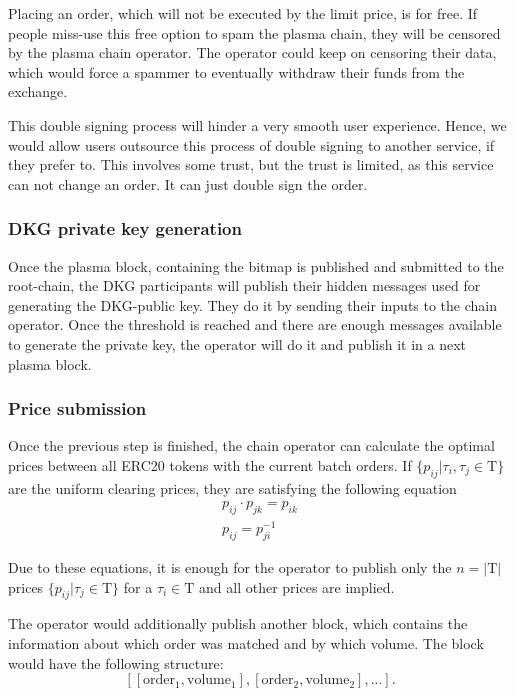 \documentclass[11pt,parskip=full]{scrartcl}%
\newcommand{\Tau}{\mathrm{T}}
\begin{document}
Placing an order, which will not be executed by the limit price, is for free. 
If people miss-use this free option to spam the plasma chain, they will be censored by the plasma chain operator. 
The operator could keep on censoring their data, which would force a spammer to eventually withdraw their funds from the exchange. 

This double signing process will hinder a very smooth user experience. 
Hence, we would allow users outsource this process of double signing to another service, if they prefer to. 
This involves some trust, but the trust is limited, as this service can not change an order. It can just double sign the order. 

\subsubsection{DKG private key generation}
Once the plasma block, containing the bitmap is published and submitted to the root-chain, the DKG participants will publish their hidden messages used for generating the DKG-public key. 
They do it by sending their inputs to the chain operator.
Once the threshold is reached and there are enough messages available to generate the private key, the operator will do it and publish it in a next plasma block. 

\subsubsection{Price submission}
Once the previous step is finished, the chain operator can calculate the optimal prices between all ERC20 tokens with the current batch orders. 
If $\{p_{ij}| \tau_i, \tau_j \in \Tau \}$  are the uniform clearing prices, they are satisfying the following equation
\begin{align}
    \label{eq:arbitrage_freeness}
  p_{ij} \cdot p_{jk} = p_{ik}\\
  p_{ij} = p_{ji}^{-1}
\end{align}

Due to these equations, it is enough for the operator to publish only the $n=|\Tau|$ prices $\{p_{ij}| \tau_j \in \Tau \}$ for a $ \tau_i \in \Tau$ and all other prices are implied. 

The operator would additionally publish another block, which contains the information about which order was matched and by which volume. 
The block would have the following structure:
\[[[\text{order}_1, \text{volume}_1], [\text{order}_2, \text{volume}_2],...].\]
\end{document}
